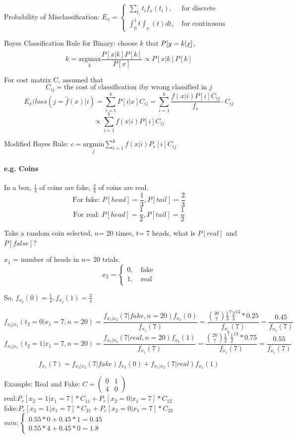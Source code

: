 \documentclass{article}
\begin{document}
{    Probability of Misclassification: \(E_x= \begin{cases}
        \sum_{t_i}t_if_x(t_i), &\   \text{for discrete} \\
        \int_{0}^{1}t\int_{x}(t)dt, &\  \text{for continuous}
    \end{cases}\)

    Bayes Classification Rule for Binary: choose $k$ that $P[y=k|\uwave{x}]$,
    \[k= \underset{k}{\mathrm{argmax}}\frac{P[x|k]P[k]}{P[x]} \propto P[x|k]P[k]\]

    For cost matrix C, assumed that
    \[C_{ij}= \text{the cost of classification } i \text{by wrong classified in } j\]
    \[E_x(loss(j=\hat{f}(x)|i)= \sum_{i=1}^{k}P[i|x]C_{ij} = \sum_{i=1}^{k}\frac{f(x|i)P[i]C_{ij}}{f_x} \cdot C_{ij}\]
    \[ \propto \sum_{i=1}^{k}f(x|i)P[i]C_{ij}\]

    Modified Bayes Rule: \(c= \underset{j}{\mathrm{argmin}}\sum_{i=1}^{k}f(x|i)P_r[i]C_{ij}\)

    \paragraph{e.g. Coins}{
        In a box, $\frac{1}{4}$ of coins are fake, $\frac{3}{4} $ of coins are real.
        \[\text{For fake: } P[head]= \frac{1}{3}, P[tail]= \frac{2}{3} \]
        \[\text{For real: } P[head]= \frac{1}{2}, P[tail]= \frac{1}{2} \]

        Take a random coin selected, $n$= 20 times, $t$= 7 heads, what is $P[real]$ and $P[false]$?

        $x_1$ = number of heads in $n$= 20 trials.
        \[x_2= \begin{cases} 
            0,  &\   \text{fake}\\ 
            1,  &\   \text{real}
        \end{cases}\]

        So, \(f_{x_2}(0)=\frac{1}{4}, f_{x_2}(1)=\frac{3}{4}\)

        \[f_{x_2|x_1}(t_2= 0|x_1=7, n= 20)=\frac{f_{x_1|x_2}(7|fake, n= 20)f_{x_2}(0)}{f_{x_1}(7)}=\frac{{20\choose 7}\frac{1}{3}^7\frac{2}{3}^13*0.25}{f_{x_1}(7)}=\frac{0.45}{f_{x_1}(7)}\]
        \[f_{x_2|x_1}(t_2= 1|x_1=7, n= 20)=\frac{f_{x_1|x_2}(7|real, n= 20)f_{x_2}(1)}{f_{x_1}(7)}=\frac{{20\choose 7}\frac{1}{2}^7\frac{1}{2}^13*0.75}{f_{x_1}(7)}=\frac{0.55}{f_{x_1}(7)}\]

        \[f_{x_1}(7)=f_{x_1|x_2}(7|fake)f_{x_2}(0)+f_{x_1|x_2}(7|real)f_{x_2}(1)\]

    }
}


Example: Real and Fake: $C=\begin{pmatrix} 0 & 1 \\ 4 & 0 \end{pmatrix}$
\\real:$P_r[x_2=1|x_1=7]*C_{11}+P_r[x_2=0|x_1=7]*C_{12}$
\\fake:$P_r[x_2=1|x_1=7]*C_{21}+P_r[x_2=0|x_1=7]*C_{22}$
\\$min:\begin{cases} 0.55*0+0.45*1=0.45 \\ 
	0.55*4+0.45*0=1.8 \end{cases}$
\end{document}
